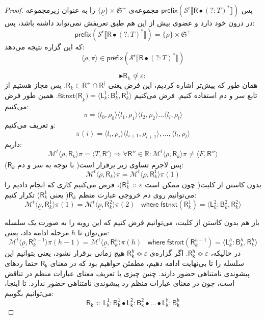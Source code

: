 \begin{proof}
پس 
$\mathsf{prefix(\mathcal{S}^r \llbracket \mathsf{R} \bullet (?:\mathit{T})^* \rrbracket)}$
مجموعه‌ی 
$\{\underline{\rho}\} \times \mathfrak{S}^+$
را به عنوان زیرمجموعه در درون خود دارد و عضوی بیش از این هم طبق تعریفش نمی‌تواند داشته باشد، پس:
$$\mathsf{prefix(\mathcal{S}^r \llbracket \mathsf{R} \bullet (?:\mathit{T})^* \rrbracket)}=
\{\underline{\rho}\} \times \mathfrak{S}^+$$
که این گزاره نتیجه می‌دهد:
$$\langle \underline{\rho}, \pi \rangle \in \mathsf{prefix(\mathcal{S}^r \llbracket \mathsf{R} \bullet (?:\mathit{T})^* \rrbracket)}$$

$$\blacktriangleright \mathsf{R}_k \not\Bumpeq \varepsilon:$$
همان طور که پیش‌تر اشاره کردیم، این فرض یعنی
$\mathsf{R}_k \in \mathsf{R}^+ \cap \mathsf{R}^\nmid$.
پس مجاز هستیم از تابع سر و دم استفاده کنیم. فرض می‌کنیم 
$\mathsf{fstnxt(R}_k) = \langle \mathsf{L}_k^1 : \mathsf{B}_k^1 , \mathsf{R}_k^1 \rangle$.
همین طور فرض می‌کنیم:
$$\pi = \langle l_0,\rho_0 \rangle \langle l_1 , \rho_1 \rangle \langle l_2 , \rho_2 \rangle ... \langle l_l , \rho_l \rangle$$
و تعریف می‌کنیم:
$$\pi(i)=\langle l_i , \rho_i\rangle \langle l_{i+1},\rho_{i+1}\rangle,...,\langle l_l,\rho_l \rangle$$
داریم:
$$\mathcal{M}^t \langle \underline{\rho},\mathsf{R}_k \rangle \pi = \langle \mathit{T} , \mathsf{R'} \rangle \Rightarrow \forall \mathsf{R''} \in \mathbb{R}: \mathcal{M}^t \langle \underline{\rho},\mathsf{R}_k \rangle \pi \neq \langle \mathit{F},\mathsf{R}'' \rangle$$
پس لاجرم تساوی زیر برقرار است( با توجه به سر و دم $\mathsf{R}_k$):
$$\mathcal{M}^t \langle \underline{\rho}, \mathsf{R}_k \rangle \pi= \mathcal{M}^t \langle \underline{\rho}, \mathsf{R}_k^1 \rangle \pi(1)$$
بدون کاستن از کلیت( چون ممکن است $\mathsf{R}_k^1 \Bumpeq \varepsilon$)، فرض می‌کنیم کاری که انجام دادیم را می‌توانیم روی دم خروجی عبارت منظم $\mathsf{R}_k$( یعنی $\mathsf{R}_k^1$) تکرار کنیم:
$$\mathcal{M}^t \langle \underline{\rho}, \mathsf{R}_k^1 \rangle \pi(1)= \mathcal{M}^t \langle \underline{\rho}, \mathsf{R}_k^2 \rangle \pi(2)\;\;\; \mathsf{where\;fstnxt}(\mathsf{R}_k^1)=\langle \mathsf{L}_k^2 : \mathsf{B}_k^2 , \mathsf{R}_k^2 \rangle$$

باز هم بدون کاستن از کلیت، می‌توانیم فرض کنیم که این رویه را به صورت یک سلسله می‌توان تا $h$ مرحله ادامه داد، یعنی:
$$\mathcal{M}^t \langle \underline{\rho},\mathsf{R}_k^{h-1} \rangle \pi(h-1)=\mathcal{M}^t\langle \underline{\rho},\mathsf{R}_k^{h} \rangle \pi(h) \;\;\;
\mathsf{where\;fstnxt}(\mathsf{R}_k^{h-1})=\langle \mathsf{L}_k^{h} : \mathsf{B}_k^{h} , \mathsf{R}_k^{h} \rangle$$
در حالیکه، 
$\mathsf{R_k^h} \Bumpeq \varepsilon$. 
اگر گزاره‌ی $\mathsf{R_k^h} \Bumpeq \varepsilon$ هیچ زمانی برقرار نشود، یعنی بتوانیم این سلسله را تا بی‌نهایت ادامه دهیم، مطمئن خواهیم بود که در معنای $\mathsf{R_k}$ حتما ردهای پیشوندی نامتناهی حضور دارند. چنین چیزی با تعریف معنای عبارات منظم در تناقض است، چون در معنای عبارات منظم رد پیشوندی نامتناهی حضور ندارد.
تا اینجا، می‌توانیم بگوییم:
$$\mathsf{R_k} \Bumpeq \mathsf{L_k^1 : B_k^1 \bullet L_k^2:B_k^2 \bullet ... \bullet L_k^h:B_k^h}$$


\end{proof}
